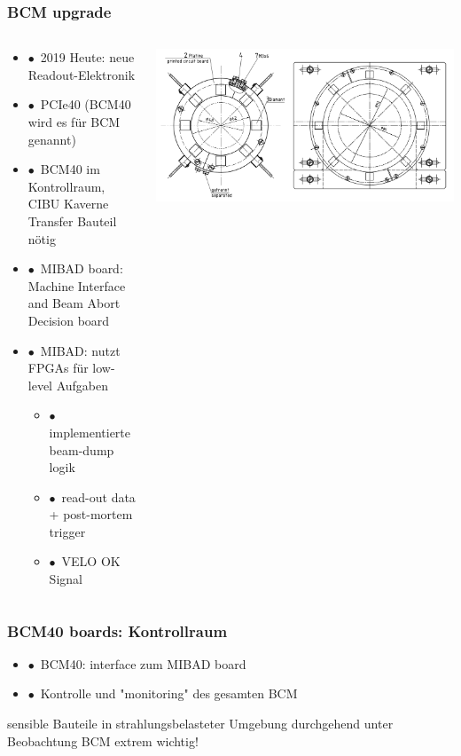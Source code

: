 \documentclass[aspectratio=1610, 12pt, xcolor=dvipsnames]{beamer}
\begin{document}
\begin{frame}\frametitle{BCM upgrade}
  \begin{columns}
    \begin{column}[c]{0.48\textwidth}
      \begin{itemize}
        \item $\bullet$\, 2019 \to Heute: neue Readout-Elektronik
        \item $\bullet$\, \to PCIe40 (BCM40 wird es für BCM genannt)
        \item $\bullet$\, BCM40 im Kontrollraum, CIBU Kaverne \to Transfer Bauteil nötig
        \item $\bullet$\, \to MIBAD board: Machine Interface and Beam Abort Decision board
        \item $\bullet$\, MIBAD: nutzt FPGAs für low-level Aufgaben
        \begin{itemize}
          \item $\bullet$\, implementierte beam-dump logik
          \item $\bullet$\, read-out data + post-mortem trigger
          \item $\bullet$\, VELO OK Signal
        \end{itemize}
      \end{itemize}
    \end{column}
    \begin{column}[c]{0.48\textwidth}
      \includegraphics[width=\textwidth]{plots/BCM_U_and_BCM_D.png}
    \end{column}
  \end{columns}
\end{frame}

\begin{frame}\frametitle{BCM40 boards: Kontrollraum}
  \begin{itemize}
    \item $\bullet$\, BCM40: interface zum MIBAD board
    \item $\bullet$\, \to Kontrolle und "monitoring" des gesamten BCM
  \end{itemize}
  \to sensible Bauteile in strahlungsbelasteter Umgebung \to durchgehend unter Beobachtung
  \to BCM extrem wichtig!
\end{frame}
\end{document}
